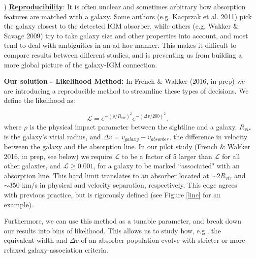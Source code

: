 \documentclass[12pt]{article}
\begin{document}

) \textbf{\underline{Reproducibility}}: It is often unclear and sometimes arbitrary how absorption features are matched with a galaxy. Some authors (e.g. Kacprzak et al. 2011) pick the galaxy closest to the detected IGM absorber, while others (e.g. Wakker $\&$ Savage 2009) try to take galaxy size and other properties into account, and most tend to deal with ambiguities in an ad-hoc manner. This makes it difficult to compare results between different studies, and is preventing us from building a more global picture of the galaxy-IGM connection.

\textbf{Our solution - Likelihood Method: } In French $\&$ Wakker (2016, in prep) we are introducing a reproducible method to streamline these types of decisions. We define the likelihood as:

\begin{equation}
	\mathcal{L} = e^{-(\rho/R_{vir})^2} e^{-(\Delta v / 200)^2},
\end{equation}
where $\rho$ is the physical impact parameter between the sightline and a galaxy, $R_{vir}$ is the galaxy's virial radius, and $\Delta v = v_{galaxy} - v_{absorber}$, the difference in velocity between the galaxy and the absorption line. In our pilot study (French $\&$ Wakker 2016, in prep, see below) we require $\mathcal{L}$ to be a factor of 5 larger than $\mathcal{L}$ for all other galaxies, and $\mathcal{L} \geq 0.001$, for a galaxy to be marked ``associated" with an absorption line. This hard limit translates to an absorber located at $\sim 2 R_{vir}$ and $\sim 350$ km/s in physical and velocity separation, respectively. This edge agrees with previous practice, but is rigorously defined (see Figure \ref{line} for an example). 

Furthermore, we can use this method as a tunable parameter, and break down our results into bins of likelihood. This allows us to study how, e.g., the equivalent width and $\Delta v$ of an absorber population evolve with stricter or more relaxed galaxy-association criteria.\\

\end{document}
